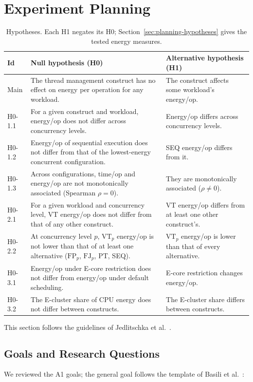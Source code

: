 \section{Experiment Planning}\label{sec:planning}
\begin{table}[tb]
\caption{Hypotheses. Each H1 negates its H0; Section~\ref{sec:planning-hypotheses} gives the tested energy measures.}
\label{tab:hypotheses}
\scriptsize
\setlength{\tabcolsep}{3pt}
\begin{tabular}{@{}l p{10.85cm} p{5.58cm}@{}}
\toprule
Id & Null hypothesis (H0) & Alternative hypothesis (H1) \\
\midrule
Main & The thread management construct has no effect on energy per operation for any workload. & The construct affects some workload's energy/op. \\
H0-1.1 & For a given construct and workload, energy/op does not differ across concurrency levels. & Energy/op differs across concurrency levels. \\
H0-1.2 & Energy/op of sequential execution does not differ from that of the lowest-energy concurrent configuration. & SEQ energy/op differs from it. \\
H0-1.3 & Across configurations, time/op and energy/op are not monotonically associated (Spearman $\rho = 0$). & They are monotonically associated ($\rho \neq 0$). \\
H0-2.1 & For a given workload and concurrency level, VT energy/op does not differ from that of any other construct. & VT energy/op differs from at least one other construct's. \\
H0-2.2 & At concurrency level $p$, $\mathrm{VT}_p$ energy/op is not lower than that of at least one alternative ($\mathrm{FP}_p$, $\mathrm{FJ}_p$, PT, SEQ). & $\mathrm{VT}_p$ energy/op is lower than that of every alternative. \\
H0-3.1 & Energy/op under E-core restriction does not differ from energy/op under default scheduling. & E-core restriction changes energy/op. \\
H0-3.2 & The E-cluster share of CPU energy does not differ between constructs. & The E-cluster share differs between constructs. \\
\bottomrule
\end{tabular}
\end{table}
This section follows the guidelines of Jedlitschka et al.~\cite{jedlitschka2008reporting}.

\subsection{Goals and Research Questions}\label{sec:planning-goals}
We reviewed the A1 goals; the general goal follows the template of Basili et al.~\cite{basili1994gqm}:

